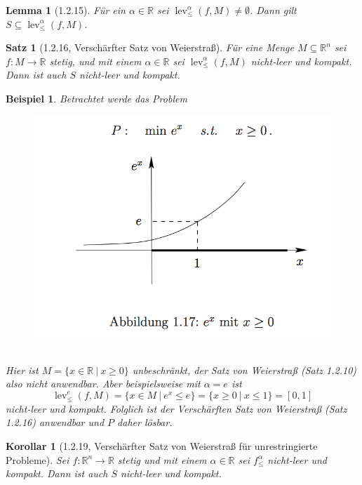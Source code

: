 \documentclass[12pt]{extreport} %
\newcommand{\R}{\mathbb{R}}
\theoremstyle{named}
\theoremstyle{nnamed}
\theoremstyle{itshape}
\newtheorem*{satz}{Satz}
\theoremstyle{normal}
\newtheorem*{beispiel}{Beispiel}
\newtheorem*{korollar}{Korollar}
\newtheorem*{lemma}{Lemma}
\begin{document}
\begin{lemma}[1.2.15]
	Für ein $\alpha \in \R$ sei $\operatorname{lev}_{\leq}^{\alpha}(f, M) \neq \emptyset$. Dann gilt $S \subseteq \operatorname{lev}_{\leq}^{\alpha}(f, M)$.
\end{lemma}

\begin{satz}[1.2.16, Verschärfter Satz von Weierstraß]
	Für eine Menge $M \subseteq \R^n$ sei $f \colon M \rightarrow \R$ stetig, und mit einem $\alpha \in \R$ sei $\operatorname{lev}^{\alpha}_{\leq}(f, M)$ nicht-leer und kompakt. Dann ist auch $S$ nicht-leer und kompakt.	
\end{satz}

\begin{beispiel}
	Betrachtet werde das Problem	 ~\\
	
	\begin{figure}[h!] \centering
		\includegraphics[scale=0.5]{img/ks-i}
	\end{figure}
	~\\
	Hier ist $M = \big\{ x \in \R ~|~x \geq 0 \big\}$ unbeschränkt, der Satz von Weierstraß (Satz 1.2.10) also nicht anwendbar. Aber beispielsweise mit $\alpha = e$ ist
	$$ \operatorname{lev}_{\leq}^{e}(f, M) = \big\{ x \in M ~|~e^x \leq e \big\} = \big\{ x \geq 0 ~|~x \leq 1 \big\} = [0, 1] $$
	nicht-leer und kompakt. Folglich ist der Verschärften Satz von Weierstraß (Satz 1.2.16) anwendbar und $P$ daher lösbar.
\end{beispiel}

\begin{korollar}[1.2.19, Verschärfter Satz von Weierstraß für unrestringierte Probleme]
Sei $f \colon \R^n \rightarrow \R$ stetig und mit einem $\alpha \in \R$ sei $f_{\leq}^{\alpha}$ nicht-leer und kompakt. Dann ist auch $S$ nicht-leer und kompakt.	
\end{korollar}
\end{document}

